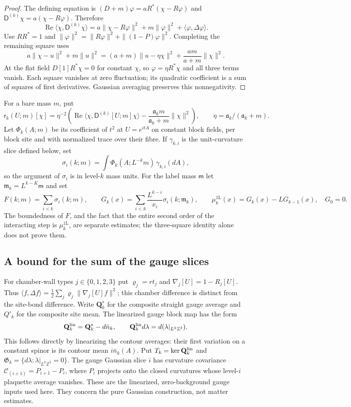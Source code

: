 \documentclass[11pt,letterpaper,reqno]{amsart}
\theoremstyle{definition}
\theoremstyle{remark}
\begin{document}
\begin{proof}
The defining equation is
$(D+m)\varphi=aR^*(\chi-R\varphi)$ and
$\mathsf D^{(k)}\chi=a(\chi-R\varphi)$.  Therefore
\[
 \operatorname{Re}\langle\chi,\mathsf D^{(k)}\chi\rangle
 =a\|\chi-R\varphi\|^2+
             m\|\varphi\|^2+\langle\varphi,\Delta\varphi\rangle.
\]
Use $RR^*=1$ and
$\|\varphi\|^2=\|R\varphi\|^2+\|(1-P)\varphi\|^2$.
Completing the remaining square uses
\[
 a\|\chi-u\|^2+m\|u\|^2
 =(a+m)\|u-\eta\chi\|^2+\frac{am}{a+m}\|\chi\|^2.
\]
At the flat field $D[1]R^*\chi=0$ for constant $\chi$, so
$\varphi=\eta R^*\chi$ and all three terms vanish.  Each square
vanishes at zero fluctuation; its quadratic coefficient is a sum of
squares of first derivatives.  Gaussian averaging preserves this
nonnegativity.
\end{proof}

For a bare mass $m$, put
\[
 \mathsf r_k(U;m)[\chi]=\eta^{-2}
 \left(\operatorname{Re}\langle\chi,
             \mathsf D^{(k)}[U;m]\chi\rangle
            -\frac{\mathfrak a_km}{\mathfrak a_k+m}\|\chi\|^2\right),
 \qquad\eta=\mathfrak a_k/(\mathfrak a_k+m).
\]
Let $\Phi_k(A;m)$ be its coefficient of $t^2$ at $U=e^{itA}$
on constant block fields, per block site and with normalized
trace over their fibre.  If $\gamma_{k,i}$ is the unit-curvature
slice defined below, set
\[
 \sigma_i(k;m)=\int\Phi_k(A;L^{-k}m)\,\gamma_{k,i}(dA),
\]
so the argument of $\sigma_i$ is in level-$k$ mass units.
For the label mass $\mathsf m$ let
$\mathfrak m_k=L^{k-K}\mathsf m$ and set
\[
 F(k;m)=\sum_{i<k}\sigma_i(k;m),\qquad
 G_k(x)=\sum_{i<k}\frac{L^{k-i}}{x_i}
                         \sigma_i(k;\mathfrak m_k),\qquad
 \mu_k^{\mathrm{1L}}(x)=G_k(x)-LG_{k-1}(x),\quad G_0=0.
\]
The boundedness of $F$, and the fact that the entire second order of
the interacting step is $\mu_k^{\mathrm{1L}}$, are separate estimates;
the three-square identity alone does not prove them.

\subsection{A bound for the sum of the gauge slices}

For chamber-wall types $j\in\{0,1,2,3\}$ put
$\varrho_j=rt_j$ and $\nabla_j[U]=1-R_j[U]$.
Thus $\langle f,\Delta f\rangle
=\tfrac12\sum_j\varrho_j\|\nabla_j[U]f\|^2$;
this chamber difference is distinct from the site-bond difference.
Write $\mathbf Q_k^s$ for the composite straight gauge average and
$Q'_k$ for the composite site mean.  The linearized gauge block
map has the form
\[
 \mathbf Q_k^{\rm lin}=\mathbf Q_k^s-d\bar n_k,
 \qquad \mathbf Q_k^{\rm lin}d\lambda
                  =d(\lambda|_{L^k\mathbb Z^3}).
\]
This follows directly by linearizing the contour averages: their
first variation on a constant spinor is its contour mean
$i\bar n_k(A)$.  Put $T_k=\ker\mathbf Q_k^{\rm lin}$ and
$\mathfrak G_k=\{d\lambda:\lambda|_{L^k\mathbb Z^3}=0\}$.
The gauge Gaussian slice $i$ has curvature covariance
$\mathcal C_{(i+1)}=P_{i+1}-P_i$, where $P_i$ projects onto
the closed curvatures whose level-$i$ plaquette average vanishes.
These are the linearized, zero-background gauge inputs used here.
They concern the pure Gaussian construction, not matter estimates.
\end{document}

